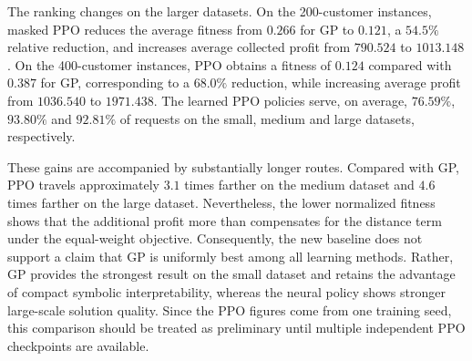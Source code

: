 \documentclass[pdflatex]{sn-jnl}
\begin{document}
The ranking changes on the larger datasets. On the 200-customer instances,
masked PPO reduces the average fitness from $0.266$ for GP to $0.121$, a
$54.5\%$ relative reduction, and increases average collected profit from
$790.524$ to $1013.148$. On the 400-customer instances, PPO obtains a fitness
of $0.124$ compared with $0.387$ for GP, corresponding to a $68.0\%$
reduction, while increasing average profit from $1036.540$ to $1971.438$.
The learned PPO policies serve, on average, $76.59\%$, $93.80\%$ and
$92.81\%$ of requests on the small, medium and large datasets, respectively.

These gains are accompanied by substantially longer routes. Compared with GP,
PPO travels approximately $3.1$ times farther on the medium dataset and $4.6$
times farther on the large dataset. Nevertheless, the lower normalized fitness
shows that the additional profit more than compensates for the distance term
under the equal-weight objective. Consequently, the new baseline does not
support a claim that GP is uniformly best among all learning methods. Rather,
GP provides the strongest result on the small dataset and retains the advantage
of compact symbolic interpretability, whereas the neural policy shows stronger
large-scale solution quality. Since the PPO figures come from one training
seed, this comparison should be treated as preliminary until multiple
independent PPO checkpoints are available.
\end{document}
